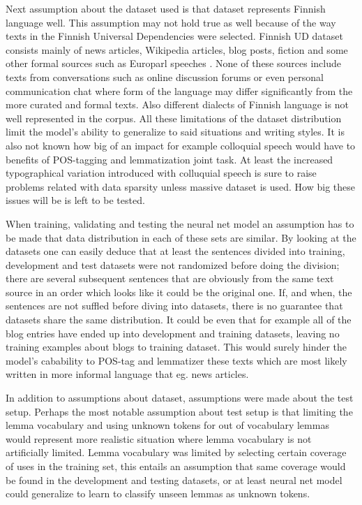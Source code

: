 \documentclass[12pt,a4paper,english
]{tutthesis}
\begin{document}
Next assumption about the dataset used is that dataset represents Finnish language well. This assumption may not hold true as well because of the way texts in the Finnish Universal Dependencies were selected. Finnish UD dataset consists mainly of news articles, Wikipedia articles, blog posts, fiction and some other formal sources such as Europarl speeches \cite{Haverinen2014}. None of these sources include texts from conversations such as online discussion forums or even personal communication chat where form of the language may differ significantly from the more curated and formal texts. Also different dialects of Finnish language is not well represented in the corpus. All these limitations of the dataset distribution limit the model's ability to generalize to said situations and writing styles. It is also not known how big of an impact for example colloquial speech would have to benefits of POS-tagging and lemmatization joint task. At least the increased typographical variation introduced with colluquial speech is sure to raise problems related with data sparsity unless massive dataset is used. How big these issues will be is left to be tested.

When training, validating and testing the neural net model an assumption has to be made that data distribution in each of these sets are similar. By looking at the datasets one can easily deduce that at least the sentences divided into training, development and test datasets were not randomized before doing the division; there are several subsequent sentences that are obviously from the same text source in an order which looks like it could be the original one. If, and when, the sentences are not suffled before diving into datasets, there is no guarantee that datasets share the same distribution. It could be even that for example all of the blog entries have ended up into development and training datasets, leaving no training examples about blogs to training dataset. This would surely hinder the model's cabability to POS-tag and lemmatizer these texts which are most likely written in more informal language that eg. news articles.

In addition to assumptions about dataset, assumptions were made about the test setup. Perhaps the most notable assumption about test setup is that limiting the lemma vocabulary and using unknown tokens for out of vocabulary lemmas would represent more realistic situation where lemma vocabulary is not artificially limited. Lemma vocabulary was limited by selecting certain coverage of uses in the training set, this entails an assumption that same coverage would be found in the development and testing datasets, or at least neural net model could generalize to learn to classify unseen lemmas as unknown tokens.
\end{document}
